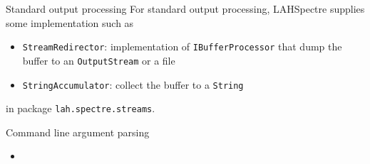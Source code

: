 \documentclass{beamer}
\begin{document}
\begin{frame}[fragile]{Standard output processing}
For standard output processing, LAHSpectre supplies some implementation such as
\begin{itemize}
\item \verb/StreamRedirector/: implementation of \verb/IBufferProcessor/ that dump the buffer to an \verb/OutputStream/ or a file
\item \verb/StringAccumulator/:  collect the buffer to a \verb/String/
\end{itemize}
in package \verb/lah.spectre.streams/.
\end{frame}

\begin{frame}[fragile]{Command line argument parsing}
\begin{itemize}
\item 
\end{itemize}
\end{frame}
\end{document}
